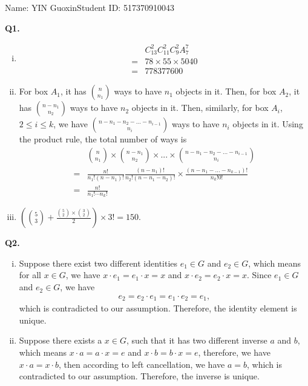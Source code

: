 \documentclass{article}[12pt]
\begin{document}
\noindent

\noindent{}
\begin{center}
\footnotesize{\quad Name: YIN Guoxin\quad Student ID: 517370910043}


\end{center}

\noindent \textbf{Q1.}
\begin{enumerate}[(i)]
\item 
\begin{align*}
&C_{13}^{2}C_{11}^{2}C_{9}^{2}A_7^7\\
=&78\times 55\times 5040\\
=&778377600
\end{align*}
\item For box $A_1$, it has $\binom{n}{n_1}$ ways to have $n_1$ objects in it. Then, for box $A_2$, it has $\binom{n-n_1}{n_2}$ ways to have $n_2$ objects in it. Then, similarly, for box $A_i$, $2\leq i\leq k$, we have $\binom{n-n_1-n_2-...-n_{i-1}}{n_i}$ ways to have $n_i$ objects in it. Using the product rule, the total number of ways is 
\begin{align*}
&\binom{n}{n_1}\times \binom{n-n_1}{n_2} \times ...\times \binom{n-n_1-n_2-...-n_{i-1}}{n_i}\\
=&\frac{n!}{n_1!(n-n_1)!}\frac{(n-n_1)!}{n_2!(n-n_1-n_2)!}\times \frac{(n-n_1-...-n_{k-1})!}{n_k!0!}\\
=&\frac{n!}{n_1!\cdots n_k!}
\end{align*}
\item $(\binom{5}{3}+\frac{\binom{5}{2}\times \binom{3}{2}}{2})\times 3!=150$.
\end{enumerate}

\noindent \textbf{Q2.}
\begin{enumerate}[(i)]
\item Suppose there exist two different identities $e_1\in G$ and $e_2\in G$, which means for all $x\in G$, we have $x\cdot e_1=e_1\cdot x=x$ and $x\cdot e_2=e_2\cdot x=x$. Since $e_1\in G$ and $e_2\in G$, we have 
\begin{align*}
e_2=e_2\cdot e_1=e_1\cdot e_2=e_1,
\end{align*}
which is contradicted to our assumption. Therefore, the identity element is unique.
\item Suppose there exists a $x\in G$, such that it has two different inverse $a$ and $b$, which means $x\cdot a=a\cdot x=e$ and $x\cdot b=b\cdot x=e$, therefore, we have $x\cdot a=x\cdot b$, then according to left cancellation, we have $a=b$, which is contradicted to our assumption. Therefore, the inverse is unique.
\end{enumerate}
\end{document}
